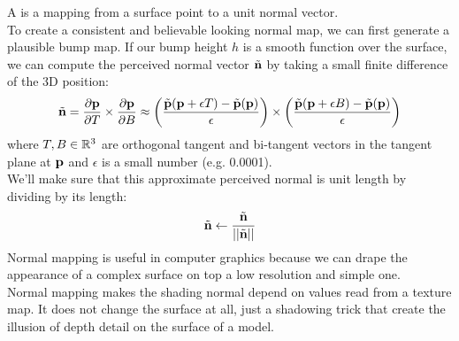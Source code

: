 \documentclass[11pt]{article}
\numberwithin{equation}{section}
\begin{document}
A  is a mapping from a surface point to a unit normal vector.\\
To create a consistent and believable looking normal map, we can first generate a plausible bump map. If our bump height $h$ is a smooth function over the surface, we can compute the perceived normal vector $\tilde{\textbf{n}}$ by taking a small finite difference of the 3D position:
\begin{equation}
	\tilde{\textbf{n}} = \frac{\partial \textbf{p}}{\partial T} \times \frac{\partial \textbf{p}}{\partial B} \approx \left( \frac{\tilde{\textbf{p}}(\textbf{p} + \epsilon T) - \tilde{\textbf{p}}(\textbf{p})}{\epsilon} \right) \times  \left( \frac{\tilde{\textbf{p}}(\textbf{p} + \epsilon B) - \tilde{\textbf{p}}(\textbf{p})}{\epsilon} \right)
\end{equation}
where $T, B \in \mathbb{R}^3$ are orthogonal tangent and bi-tangent vectors in the tangent plane at $\textbf{p}$ and $\epsilon$ is a small number (e.g. 0.0001). \\
We'll make sure that this approximate perceived normal is unit length by dividing by its length:
\begin{equation}
	\tilde{\textbf{n}} \gets \frac{\tilde{\textbf{n}}}{||\tilde{\textbf{n}}||}
\end{equation}
\remark
Normal mapping is useful in computer graphics because we can drape the appearance of a complex surface on top a low resolution and simple one.\\
\remark
Normal mapping makes the shading normal depend on values read from a texture map.
\remark
It does not change the surface at all, just a shadowing trick that create the illusion of depth detail on the surface of a model.
\end{document}
